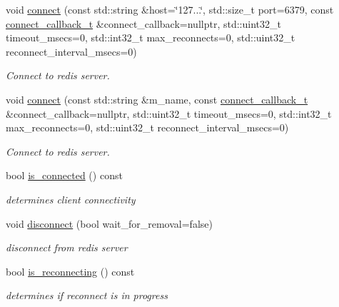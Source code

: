 \begin{DoxyCompactItemize}
void \mbox{\hyperlink{classcpp__redis_1_1subscriber_a6ae8134a9a9b31d6f2434ec4f6e86d3a}{connect}} (const std\+::string \&host=\char`\"{}127...\char`\"{}, std\+::size\+\_\+t port=6379, const \mbox{\hyperlink{classcpp__redis_1_1subscriber_a7f9e56873e5b96ad9cb2395dadae1a7a}{connect\+\_\+callback\+\_\+t}} \&connect\+\_\+callback=nullptr, std\+::uint32\+\_\+t timeout\+\_\+msecs=0, std\+::int32\+\_\+t max\+\_\+reconnects=0, std\+::uint32\+\_\+t reconnect\+\_\+interval\+\_\+msecs=0)
\begin{DoxyCompactList}\small\item\em Connect to redis server. \end{DoxyCompactList}\item 
void \mbox{\hyperlink{classcpp__redis_1_1subscriber_a8fb77a44a1e1f0d99dec639658e2aa7e}{connect}} (const std\+::string \&m_name, const \mbox{\hyperlink{classcpp__redis_1_1subscriber_a7f9e56873e5b96ad9cb2395dadae1a7a}{connect\+\_\+callback\+\_\+t}} \&connect\+\_\+callback=nullptr, std\+::uint32\+\_\+t timeout\+\_\+msecs=0, std\+::int32\+\_\+t max\+\_\+reconnects=0, std\+::uint32\+\_\+t reconnect\+\_\+interval\+\_\+msecs=0)
\begin{DoxyCompactList}\small\item\em Connect to redis server. \end{DoxyCompactList}\item 
bool \mbox{\hyperlink{classcpp__redis_1_1subscriber_af73acfc3c1859e6b32bc9a69856e6e59}{is\+\_\+connected}} () const
\begin{DoxyCompactList}\small\item\em determines client connectivity \end{DoxyCompactList}\item 
void \mbox{\hyperlink{classcpp__redis_1_1subscriber_aad1d0c3c6edb1522eb7b1bdb64b4705d}{disconnect}} (bool wait\+\_\+for\+\_\+removal=false)
\begin{DoxyCompactList}\small\item\em disconnect from redis server \end{DoxyCompactList}\item 
bool \mbox{\hyperlink{classcpp__redis_1_1subscriber_a8df4503f738566d2acab5f080cd44b53}{is\+\_\+reconnecting}} () const
\begin{DoxyCompactList}\small\item\em determines if reconnect is in progress \end{DoxyCompactList}\item 
\mbox{\label{classcpp__redis_1_1subscriber_ae93de179d6ea83ece59cf1a30493c3e9}} 

\end{DoxyCompactItemize}
